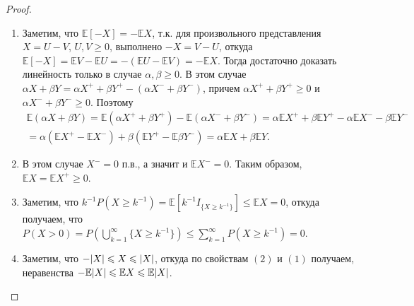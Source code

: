 \begin{proof}~
    \begin{enumerate}
        \item Заметим, что $\mathbb{E}[-X] = -\mathbb{E}X$, т.к. для произвольного представления $X = U - V$, $U, V \geqslant 0$, выполнено $-X = V - U$, откуда $\mathbb{E}[-X] = \mathbb{E}V -\mathbb{E}U = -(\mathbb{E}U -\mathbb{E}V) = -\mathbb{E}X$.
        Тогда достаточно доказать линейность только в случае $\alpha, \beta \geqslant 0$.
        В этом случае $\alpha X + \beta Y = \alpha X^+ + \beta Y^+ - (\alpha X^- + \beta Y^-)$, причем $\alpha X^+ + \beta Y^+ \geqslant 0$ и $\alpha X^- + \beta Y^- \geqslant 0$.
        Поэтому
        \begin{multline*}
            \mathbb{E}(\alpha X + \beta Y) = \mathbb{E}(\alpha X^+ + \beta Y^+) - \mathbb{E}(\alpha X^- + \beta Y^-) = \alpha \mathbb{E}X^+ + \beta \mathbb{E}Y^+ - \alpha \mathbb{E}X^- - \beta \mathbb{E} Y^- \\
            = \alpha(\mathbb{E}X^+ - \mathbb{E}X^-) + \beta(\mathbb{E}Y^+ - \mathbb{E}\beta Y^-) = \alpha\mathbb{E}X + \beta\mathbb{E}Y.
        \end{multline*}
        \item В этом случае $X^- = 0$ п.в., а значит и $\mathbb{E}X^- = 0$. Таким образом, $\mathbb{E}X = \mathbb{E}X^+ \geqslant 0$.
        \item Заметим, что $k^{-1} P(X \geqslant k^{-1}) = \mathbb{E}[k^{-1} I_{\{X \geqslant k^{-1} \}}] \leqslant \mathbb{E}X = 0$, откуда получаем, что $P(X > 0) = P(\bigcup\limits_{k = 1}^\infty \{X \geqslant k^{-1}\}) \leqslant \sum\limits_{k = 1}^\infty P(X\geqslant k^{-1}) = 0$.
        \item Заметим, что $-\abs{X} \leqslant X \leqslant \abs{X}$, откуда по свойствам $(2)$ и $(1)$ получаем, неравенства $-\mathbb{E}\abs{X} \leqslant \mathbb{E} X \leqslant \mathbb{E}\abs{X}$.
    \end{enumerate}
\end{proof}
